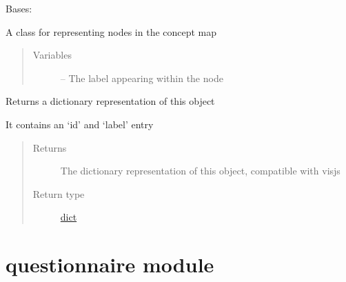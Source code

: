 \documentclass[letterpaper,10pt,english]{sphinxmanual}
\begin{document}
\begin{fulllineitems}
\label{\detokenize{node:node.Node}}
Bases: 

A class for representing nodes in the concept map
\begin{quote}\begin{description}
\item[{Variables}] \leavevmode
{} -- The label appearing within the node

\end{description}\end{quote}

\begin{fulllineitems}
\label{\detokenize{node:node.Node.to_dict}}
Returns a dictionary representation of this object

It contains an `id' and `label' entry
\begin{quote}\begin{description}
\item[{Returns}] \leavevmode
The dictionary representation of this object, compatible with visjs

\item[{Return type}] \leavevmode
\href{https://docs.python.org/2/library/stdtypes.html\#dict}{dict}

\end{description}\end{quote}

\end{fulllineitems}


\end{fulllineitems}



\section{questionnaire module}
\label{\detokenize{questionnaire:module-questionnaire}}\label{\detokenize{questionnaire::doc}}\label{\detokenize{questionnaire:questionnaire-module}}
\end{document}
